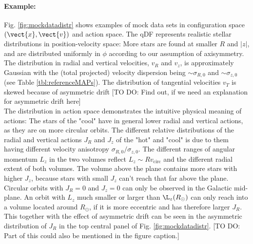 \paragraph{Example:} Fig. \ref{fig:mockdatadistr} shows examples of mock data sets in configuration space $(\vect{x},\vect{v})$ and action space.  The qDF represents realistic stellar distributions in position-velocity space: More stars are found at smaller $R$ and $|z|$, and are distributed uniformly in $\phi$ according to our assumption of axisymmetry. The distribution in radial and vertical velocities, $v_R$ and $v_z$, is approximately Gaussian with the (total projected) velocity dispersion being $\sim\sigma_{R,0}$ and $\sim\sigma_{z,0}$ (see Table \ref{tbl:referenceMAPs}). The distribution of tangential velocities $v_T$ is skewed because of asymmetric drift [TO DO: Find out, if we need an explanation for asymmetric drift here]
\\The distribution in action space demonstrates the intuitive physical meaning of actions: The stars of the "cool" \MAP have in general lower radial and vertical actions, as they are on more circular orbits. The different relative distributions of the radial and vertical actions $J_R$ and $J_z$ of the "hot" and "cool" \MAP is due to them having different velocity anisotropy $\sigma_{R,0}/\sigma_{z,0}$. The different ranges of angular momentum $L_z$ in the two volumes reflect $L_z \sim R  v_\text{circ}$ and the different radial extent of both volumes. The volume above the plane contains more stars with higher $J_z$, because stars with small $J_z$ can't reach that far above the plane. Circular orbits with $J_R = 0$ and $J_z = 0$ can only be observed in the Galactic mid-plane. An orbit with $L_z$ much smaller or larger than $\L_z(R_\odot)$ can only reach into a volume located around $R_\odot$, if it is more eccentric and has therefore larger $J_R$. This together with the effect of asymmetric drift can be seen in the asymmetric distribution of $J_R$ in the top central panel of Fig. \ref{fig:mockdatadistr}. [TO DO: Part of this could also be mentioned in the figure caption.]



